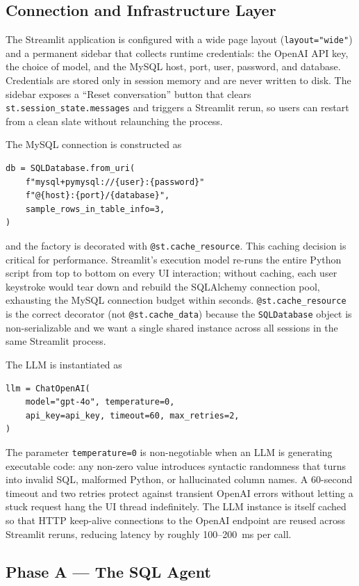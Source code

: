 \documentclass[11pt,a4paper]{article}
\begin{document}
\subsection{Connection and Infrastructure Layer}

The Streamlit application is configured with a wide page layout
(\texttt{layout="wide"}) and a permanent sidebar that collects runtime
credentials: the OpenAI API key, the choice of model, and the MySQL
host, port, user, password, and database. Credentials are stored only
in session memory and are never written to disk. The sidebar exposes a
``Reset conversation'' button that clears
\texttt{st.session\_state.messages} and triggers a Streamlit rerun, so
users can restart from a clean slate without relaunching the process.

The MySQL connection is constructed as
\begin{lstlisting}
db = SQLDatabase.from_uri(
    f"mysql+pymysql://{user}:{password}"
    f"@{host}:{port}/{database}",
    sample_rows_in_table_info=3,
)
\end{lstlisting}
and the factory is decorated with \texttt{@st.cache\_resource}. This
caching decision is critical for performance. Streamlit's execution
model re-runs the entire Python script from top to bottom on every UI
interaction; without caching, each user keystroke would tear down and
rebuild the SQLAlchemy connection pool, exhausting the MySQL connection
budget within seconds. \texttt{@st.cache\_resource} is the correct
decorator (not \texttt{@st.cache\_data}) because the
\texttt{SQLDatabase} object is non-serializable and we want a single
shared instance across all sessions in the same Streamlit process.

The LLM is instantiated as
\begin{lstlisting}
llm = ChatOpenAI(
    model="gpt-4o", temperature=0,
    api_key=api_key, timeout=60, max_retries=2,
)
\end{lstlisting}
The parameter \texttt{temperature=0} is non-negotiable when an LLM is
generating executable code: any non-zero value introduces syntactic
randomness that turns into invalid SQL, malformed Python, or
hallucinated column names. A 60-second timeout and two retries protect
against transient OpenAI errors without letting a stuck request hang
the UI thread indefinitely. The LLM instance is itself cached so that
HTTP keep-alive connections to the OpenAI endpoint are reused across
Streamlit reruns, reducing latency by roughly 100--200~ms per call.

\subsection{Phase A --- The SQL Agent}
\end{document}

